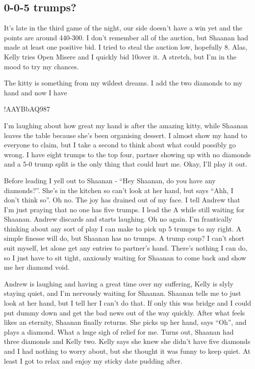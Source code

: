 \documentclass[a4paper]{JoshCards}
\begin{document}
\subsection*{0-0-5 trumps?}


\gamefont{\larger}
\northhand{}{}{}{}
\westhand{}{}{}{}
\easthand{}{}{}{}
\leftupper{}%
{}{}
\leftupper{}{}{\contract: 10\D}
\rightupper{}{}{}
\showAll*

It's late in the third game of the night, our side doesn't have a win yet and the points are around 440-300. I don't remember all of the auction, but Shaanan had made at least one positive bid. I tried to steal the auction low, hopefully 8\D. Alas, Kelly tries Open Misere and I quickly bid 10\D over it. A stretch, but I'm in the mood to try my chances.

The kitty is something from my wildest dreams. I add the two diamonds to my hand and now I have 

\par\noindent
\hand*!{A}{A}{YBbAQ987}{}

I'm laughing about how great my hand is after the amazing kitty, while Shaanan leaves the table because she's been organising dessert. I almost show my hand to everyone to claim, but I take a second to think about what could possibly go wrong. I have eight trumps to the top four, partner showing up with no diamonds and a 5-0 trump split is the only thing that could hurt me. Okay, I'll play it out. 

Before leading I yell out to Shaanan - ``Hey Shaanan, do you have any diamonds?''. She's in the kitchen so can't look at her hand, but says ``Ahh, I don't think so''. Oh no. The joy has drained out of my face. I tell Andrew that I'm just praying that no one has five trumps. I lead the \D A while still waiting for Shaanan. Andrew discards and starts laughing. Oh no again. I'm frantically thinking about any sort of play I can make to pick up 5 trumps to my right. A simple finesse will do, but Shaanan has no trumps. A trump coup? I can't short suit myself, let alone get any entries to partner's hand. There's nothing I can do, so I just have to sit tight, anxiously waiting for Shaanan to come back and show me her diamond void.

Andrew is laughing and having a great time over my suffering, Kelly is slyly staying quiet, and I'm nervously waiting for Shaanan. Shaanan tells me to just look at her hand, but I tell her I can't do that. If only this was bridge and I could put dummy down and get the bad news out of the way quickly. After what feels likes an eternity, Shaanan finally returns. She picks up her hand, says ``Oh'', and plays a diamond. What a huge sigh of relief for me. Turns out, Shaanan had three diamonds and Kelly two. Kelly says she knew she didn't have five diamonds and I had nothing to worry about, but she thought it was funny to keep quiet. At least I got to relax and enjoy my sticky date pudding after.
\end{document}
